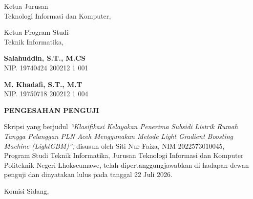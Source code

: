 \documentclass[12pt, a4paper, onecolumn, oneside]{report}
\begin{document}
\vspace{0.3cm}

\noindent
\begin{minipage}[t]{0.4\textwidth}
\parbox[t][1cm][t]{\linewidth}{Ketua Jurusan\\
Teknologi Informasi dan Komputer,}
\end{minipage}\hfill
\begin{minipage}[t]{0.4\textwidth}
\parbox[t][1cm][t]{\linewidth}{Ketua Program Studi\\
Teknik Informatika,}
\end{minipage}

\vspace{2cm}

\noindent
\begin{minipage}[t]{0.4\textwidth}
{\bfseries Salahuddin, S.T., M.CS}\\
NIP. 19740424 200212 1 001
\end{minipage}\hfill
\begin{minipage}[t]{0.4\textwidth}
{\bfseries M. Khadafi, S.T., M.T}\\
NIP. 19750718 200212 1 004
\end{minipage}

\newpage
{}
{}
\begin{center}
{\fontsize{14pt}{16pt}\selectfont\bfseries PENGESAHAN PENGUJI}
\end{center}
\vspace{0.5cm}

\noindent Skripsi yang berjudul \textit{``Klasifikasi Kelayakan Penerima Subsidi Listrik Rumah Tangga Pelanggan PLN Aceh Menggunakan Metode Light Gradient Boosting Machine (LightGBM)''}, disusun oleh Siti Nur Faiza, NIM 2022573010045, Program Studi Teknik Informatika, Jurusan Teknologi Informasi dan Komputer Politeknik Negeri Lhokseumawe, telah dipertanggungjawabkan di hadapan dewan penguji dan dinyatakan lulus pada tanggal 22 Juli 2026.

\vspace{0.5cm}

\begin{center}
Komisi Sidang,
\end{center}

\vspace{0.7cm}
\end{document}
